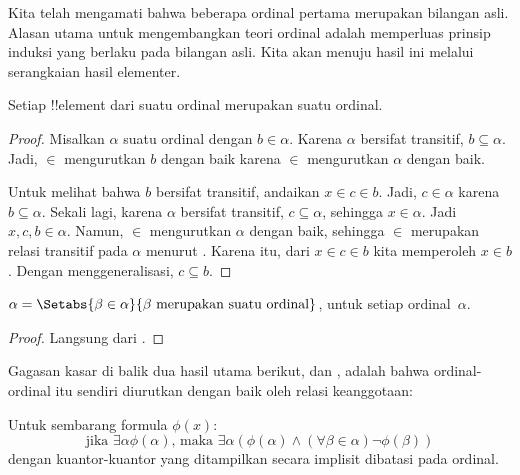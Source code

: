 \documentclass[../../../include/open-logic-section]{subfiles}
\begin{document}

Kita telah mengamati bahwa beberapa ordinal pertama merupakan bilangan asli.
Alasan utama untuk mengembangkan teori ordinal adalah memperluas prinsip
induksi yang berlaku pada bilangan asli. Kita akan menuju hasil ini melalui
serangkaian hasil elementer.

\begin{lem}
Setiap !!{element} dari suatu ordinal merupakan suatu ordinal.
\end{lem}

\begin{proof}
Misalkan $\alpha$ suatu ordinal dengan $b \in \alpha$. Karena $\alpha$
bersifat transitif, $b \subseteq \alpha$. Jadi, $\in$ mengurutkan $b$ dengan
baik karena $\in$ mengurutkan $\alpha$ dengan baik.

Untuk melihat bahwa $b$ bersifat transitif, andaikan $x \in c \in b$. Jadi,
$c \in \alpha$ karena $b \subseteq \alpha$. Sekali lagi, karena $\alpha$
bersifat transitif, $c \subseteq \alpha$, sehingga $x \in \alpha$. Jadi $x,
c, b \in \alpha$. Namun, $\in$ mengurutkan $\alpha$ dengan baik, sehingga
$\in$ merupakan relasi transitif pada $\alpha$ menurut
. Karena itu, dari $x \in c \in b$
kita memperoleh $x \in b$. Dengan menggeneralisasi, $c \subseteq b$.
\end{proof}

\begin{cor}
$\alpha = \Setabs{\beta \in \alpha}{\beta \text{ merupakan suatu ordinal}}$,
untuk setiap ordinal~$\alpha$.
\end{cor}

\begin{proof}
Langsung dari .
\end{proof}

Gagasan kasar di balik dua hasil utama berikut,
 dan , adalah bahwa
ordinal-ordinal itu sendiri diurutkan dengan baik oleh relasi keanggotaan:

\begin{thm}
Untuk sembarang formula $\phi(x)$:
\[
	\text{jika }\exists \alpha \phi(\alpha)\text{, maka }\exists \alpha(\phi(\alpha)
	\land  (\forall \beta \in \alpha) \lnot \phi(\beta))
\]
dengan kuantor-kuantor yang ditampilkan secara implisit dibatasi pada
ordinal.
\end{thm}
\end{document}
